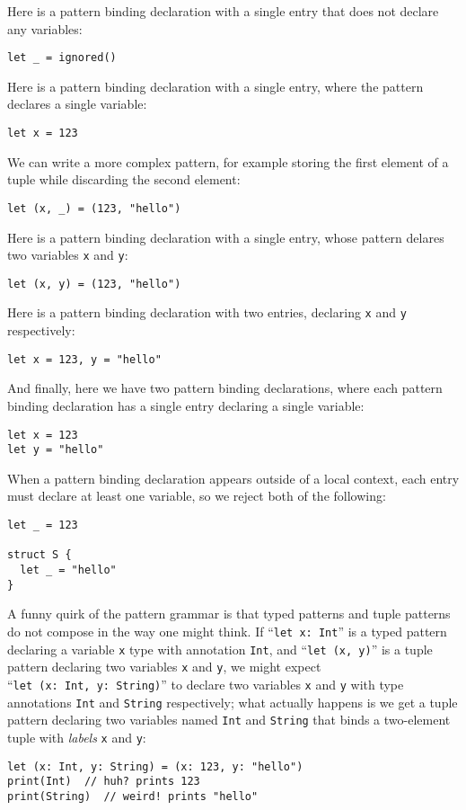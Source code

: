 \documentclass[../generics]{subfiles}
\begin{document}
Here is a pattern binding declaration with a single entry that does not declare any variables:
\begin{Verbatim}
let _ = ignored()
\end{Verbatim}
Here is a pattern binding declaration with a single entry, where the pattern declares a single variable:
\begin{Verbatim}
let x = 123
\end{Verbatim}
We can write a more complex pattern, for example storing the first element of a tuple while discarding the second element:
\begin{Verbatim}
let (x, _) = (123, "hello")
\end{Verbatim}
Here is a pattern binding declaration with a single entry, whose pattern delares two variables \texttt{x} and \texttt{y}:
\begin{Verbatim}
let (x, y) = (123, "hello")
\end{Verbatim}
Here is a pattern binding declaration with two entries, declaring \texttt{x} and \texttt{y} respectively:
\begin{Verbatim}
let x = 123, y = "hello"
\end{Verbatim}
And finally, here we have two pattern binding declarations, where each pattern binding declaration has a single entry declaring a single variable:
\begin{Verbatim}
let x = 123
let y = "hello"
\end{Verbatim}
When a pattern binding declaration appears outside of a local context, each entry must declare at least one variable, so we reject both of the following:
\begin{Verbatim}
let _ = 123

struct S {
  let _ = "hello"
}
\end{Verbatim}

A funny quirk of the pattern grammar is that typed patterns and tuple patterns do not compose in the way one might think. If ``\texttt{let x:~Int}'' is a typed pattern declaring a variable \texttt{x} type with annotation \texttt{Int}, and ``\texttt{let (x, y)}'' is a tuple pattern declaring two variables \texttt{x} and \texttt{y}, we might expect ``\texttt{let~(x:~Int,~y:~String)}'' to declare two variables \texttt{x} and \texttt{y} with type annotations \texttt{Int} and \texttt{String} respectively; what actually happens is we get a tuple pattern declaring two variables named \texttt{Int} and \texttt{String} that binds a two-element tuple with \emph{labels} \texttt{x} and \texttt{y}:
\begin{Verbatim}
let (x: Int, y: String) = (x: 123, y: "hello")
print(Int)  // huh? prints 123
print(String)  // weird! prints "hello"
\end{Verbatim}
\end{document}
